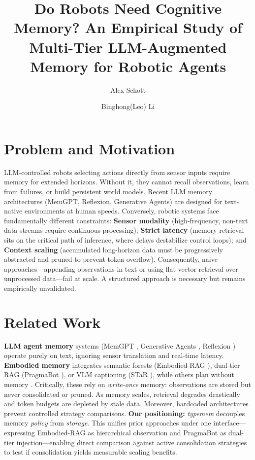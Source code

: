 \documentclass[11pt]{article}
\title{\vspace{-0.6in}\Large Do Robots Need Cognitive Memory? An Empirical Study of\\Multi-Tier LLM-Augmented Memory for Robotic Agents\vspace{-0.15in}}
\author{Alex Schott \and Binghong(Leo) Li}
\date{\vspace{-0.4in}}
\begin{document}
\maketitle

\section{Problem and Motivation}

LLM-controlled robots selecting actions directly from sensor inputs require memory for extended horizons. Without it, they cannot recall observations, learn from failures, or build persistent world models. Recent LLM memory architectures (MemGPT, Reflexion, Generative Agents) are designed for text-native environments at human speeds. Conversely, robotic systems face fundamentally different constraints: \textbf{Sensor modality} (high-frequency, non-text data streams require continuous processing); \textbf{Strict latency} (memory retrieval sits on the critical path of inference, where delays destabilize control loops); and \textbf{Context scaling} (accumulated long-horizon data must be progressively abstracted and pruned to prevent token overflow). Consequently, naive approaches—appending observations in text or using flat vector retrieval over unprocessed data—fail at scale. A structured approach is necessary but remains empirically unvalidated.

\section{Related Work}

\textbf{LLM agent memory} systems (MemGPT \cite{packer2023memgpt}, Generative Agents \cite{park2023generative}, Reflexion \cite{shinn2023reflexion}) operate purely on text, ignoring sensor translation and real-time latency. \textbf{Embodied memory} integrates semantic forests (Embodied-RAG \cite{xie2024embodiedrag}), dual-tier RAG (PragmaBot \cite{pragmabot2025}), or VLM captioning (STaR \cite{star2025}), while others plan without memory \cite{ahn2022saycan, chen2023typefly}. Critically, these rely on \textit{write-once} memory: observations are stored but never consolidated or pruned. As memory scales, retrieval degrades drastically and token budgets are depleted by stale data. Moreover, hardcoded architectures prevent controlled strategy comparisons. \textbf{Our positioning:} \textit{typemem} decouples memory \emph{policy} from \emph{storage}. This unifies prior approaches under one interface—expressing Embodied-RAG as hierarchical observation and PragmaBot as dual-tier injection—enabling direct comparison against active consolidation strategies to test if consolidation yields measurable scaling benefits.
\end{document}
